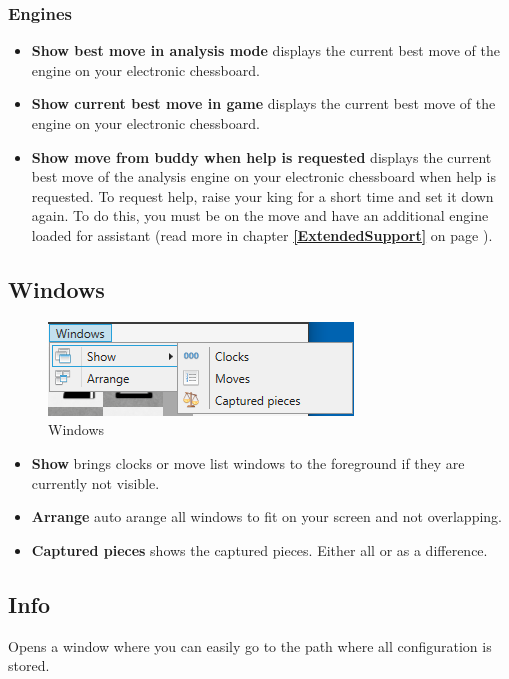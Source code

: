\documentclass[11pt,a4paper]{article}
\begin{document}
	\subsubsection{Engines}
	\begin{itemize}
		\item \textbf{Show best move in analysis mode} displays the current best move of the engine on your electronic chessboard.
		\item \textbf{Show current best move in game} displays the current best move of the engine on your electronic chessboard.	
		\item \textbf{Show move from buddy when help is requested} displays the current best move of the analysis engine on your electronic chessboard when help is requested. To request help, raise your king for a short time and set it down again. To do this, you must be on the move and have an additional engine loaded for assistant (read more in chapter \textbf{\ref{ExtendedSupport}  } on page \pageref{ExtendedSupport}).
	\end{itemize}
	
	\subsection{Windows}
	\begin{figure}[H]
		\centering
		\includegraphics[scale=1.0]{Windows.png}
		\caption{Windows}
		\label{fig:Windows}
	\end{figure}
	\begin{itemize}
		\item \textbf{Show} brings clocks or move list windows to the foreground if they are currently not visible.
		\item \textbf{Arrange} auto arange all windows to fit on your screen and not overlapping.
		\item \textbf{Captured pieces} shows the captured pieces. Either all or as a difference. 
	\end{itemize}
	
	\subsection{Info}
	Opens a window where you can easily go to the path where all configuration is stored.
	
\end{document}
